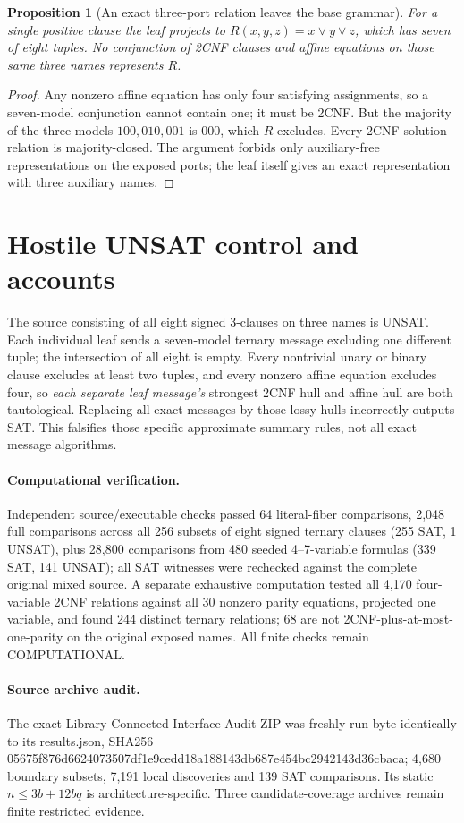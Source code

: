 \documentclass[11pt]{article}
\newtheorem{proposition}[theorem]{Proposition}
\begin{document}
\begin{proposition}[An exact three-port relation leaves the base grammar]
For a single positive clause the leaf projects to $R(x,y,z)=x\vee y\vee z$, which has seven of eight tuples. No conjunction of 2CNF clauses and affine equations on those same three names represents $R$.
\end{proposition}
\begin{proof}
Any nonzero affine equation has only four satisfying assignments, so a seven-model conjunction cannot contain one; it must be 2CNF. But the majority of the three models $100,010,001$ is $000$, which $R$ excludes. Every 2CNF solution relation is majority-closed. The argument forbids only auxiliary-free representations on the exposed ports; the leaf itself gives an exact representation with three auxiliary names.
\end{proof}
\section{Hostile UNSAT control and accounts}
The source consisting of all eight signed 3-clauses on three names is UNSAT. Each individual leaf sends a seven-model ternary message excluding one different tuple; the intersection of all eight is empty. Every nontrivial unary or binary clause excludes at least two tuples, and every nonzero affine equation excludes four, so \emph{each separate leaf message's} strongest 2CNF hull and affine hull are both tautological. Replacing all exact messages by those lossy hulls incorrectly outputs SAT. This falsifies those specific approximate summary rules, not all exact message algorithms.
\paragraph{Computational verification.}
Independent source/executable checks passed 64 literal-fiber comparisons, 2,048 full comparisons across all 256 subsets of eight signed ternary clauses (255 SAT, 1 UNSAT), plus 28,800 comparisons from 480 seeded 4--7-variable formulas (339 SAT, 141 UNSAT); all SAT witnesses were rechecked against the complete original mixed source. A separate exhaustive computation tested all 4,170 four-variable 2CNF relations against all 30 nonzero parity equations, projected one variable, and found 244 distinct ternary relations; 68 are not 2CNF-plus-at-most-one-parity on the original exposed names. All finite checks remain COMPUTATIONAL.
\paragraph{Source archive audit.}
The exact Library Connected Interface Audit ZIP was freshly run byte-identically to its results.json, SHA256 05675f876d6624073507df1e9cedd18a188143db687e454bc2942143d36cbaca; 4,680 boundary subsets, 7,191 local discoveries and 139 SAT comparisons. Its static $n\le3b+12bq$ is architecture-specific. Three candidate-coverage archives remain finite restricted evidence.
\end{document}
